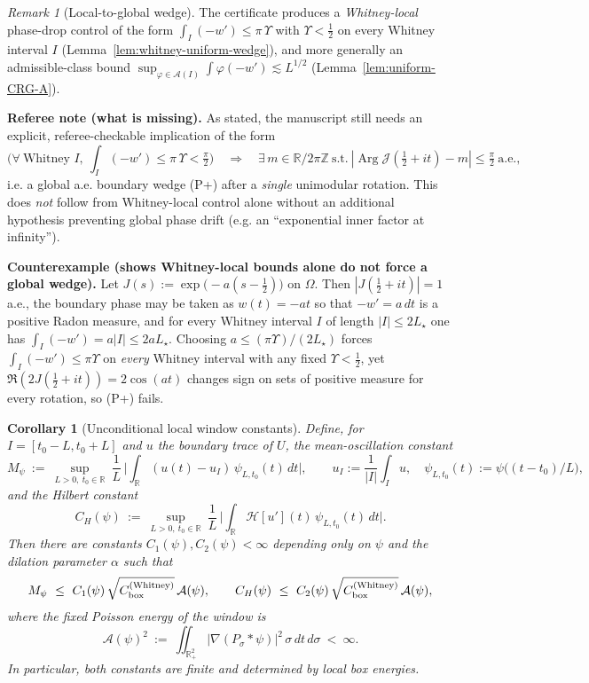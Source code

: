 \documentclass[11pt]{article}
\newtheorem{corollary}[theorem]{Corollary}
\theoremstyle{definition}
\theoremstyle{remark}
\newtheorem{remark}[theorem]{Remark}
\theoremstyle{definition}
\newcommand{\R}{\mathbb{R}}
\DeclareMathOperator{\Arg}{Arg}
\begin{document}
\begin{remark}[Local-to-global wedge]\label{rem:wedge-application}
The certificate produces a \emph{Whitney-local} phase-drop control of the form
\(\int_I(-w')\le \pi\,\Upsilon\) with \(\Upsilon<\tfrac12\) on every Whitney interval \(I\)
(Lemma~\ref{lem:whitney-uniform-wedge}), and more generally an admissible-class bound
\(\sup_{\varphi\in\mathcal A(I)}\int \varphi(-w')\lesssim L^{1/2}\) (Lemma~\ref{lem:uniform-CRG-A}).

\medskip
\noindent\textbf{Referee note (what is missing).}
As stated, the manuscript still needs an explicit, referee-checkable implication of the form
\[
  \Big(\forall\ \text{Whitney }I,\ \int_I(-w')\le \pi\,\Upsilon<\tfrac{\pi}{2}\Big)
  \quad\Longrightarrow\quad
  \exists\,m\in\R/2\pi\mathbb Z\ \text{s.t.}\ |\Arg \mathcal J(\tfrac12+it)-m|\le \tfrac{\pi}{2}\ \text{a.e.},
\]
i.e. a global a.e. boundary wedge \textup{(P+)} after a \emph{single} unimodular rotation.
This does \emph{not} follow from Whitney-local control alone without an additional hypothesis preventing
global phase drift (e.g. an “exponential inner factor at infinity”).

\medskip
\noindent\textbf{Counterexample (shows Whitney-local bounds alone do not force a global wedge).}
Let \(J(s):=\exp\!\big(-a(s-\tfrac12)\big)\) on \(\Omega\). Then \(|J(\tfrac12+it)|=1\) a.e., the boundary phase may be taken as
\(w(t)=-at\) so that \(-w'=a\,dt\) is a positive Radon measure, and for every Whitney interval \(I\) of length \(|I|\le 2L_\star\) one has
\(\int_I(-w')=a|I|\le 2aL_\star\).
Choosing \(a\le (\pi\Upsilon)/(2L_\star)\) forces \(\int_I(-w')\le \pi\Upsilon\) on \emph{every} Whitney interval with any fixed \(\Upsilon<\tfrac12\),
yet \(\Re(2J(\tfrac12+it))=2\cos(at)\) changes sign on sets of positive measure for every rotation, so \textup{(P+)} fails.
\end{remark}
\begin{corollary}[Unconditional local window constants]\label{cor:CH-Mpsi-final}
Define, for $I=[t_0-L,t_0+L]$ and $u$ the boundary trace of $U$, the mean-oscillation constant
\[
  M_\psi\ :=\ \sup_{L>0,\ t_0\in\R}\ \frac{1}{L}\,\Big|\int_{\R} (u(t)-u_I)\,\psi_{L,t_0}(t)\,dt\Big|,\qquad u_I:=\frac{1}{|I|}\int_I u,\quad \psi_{L,t_0}(t):=\psi\big((t-t_0)/L\big),
\]
and the Hilbert constant
\[
  C_H(\psi)\ :=\ \sup_{L>0,\ t_0\in\R}\ \frac{1}{L}\,\Big|\int_{\R} \mathcal H[u'](t)\,\psi_{L,t_0}(t)\,dt\Big|.
\]
Then there are constants $C_1(\psi),C_2(\psi)<\infty$ depending only on $\psi$ and the dilation parameter $\alpha$ such that
\[
  M_\psi\ \le\ C_1(\psi)\,\sqrt{C_{\rm box}^{(\mathrm{Whitney})}}\,\mathcal A(\psi),\qquad
  C_H(\psi)\ \le\ C_2(\psi)\,\sqrt{C_{\rm box}^{(\mathrm{Whitney})}}\,\mathcal A(\psi),
\]
where the fixed Poisson energy of the window is
\[
  \mathcal A(\psi)^2\ :=\ \iint_{\R^2_+}|\nabla(P_\sigma*\psi)|^2\,\sigma\,dt\,d\sigma\ <\ \infty.
\]
In particular, both constants are finite and determined by local box energies.
\end{corollary}
\end{document}
